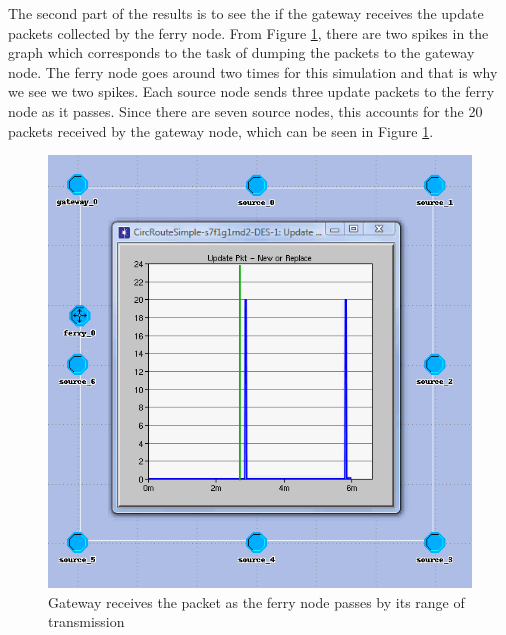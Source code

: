 The second part of the results is to see the if the gateway receives the update packets collected by the ferry node.  From Figure \ref{fig:result1-b}, there are two spikes in the graph which corresponds to the task of dumping the packets to the gateway node.  
The ferry node goes around two times for this simulation and that is why we see we two spikes.  
Each source node sends three update packets to the ferry node as it passes.  
Since there are seven source nodes, this accounts for the 20 packets received by the gateway node, which can be seen in Figure \ref{fig:result1-b}.


\begin{figure}[h]
    \centering
    \includegraphics[width=.5\textwidth]{images/scenario1-result-gateway}
    \caption{Gateway receives the packet as the ferry node passes by its range of transmission}
    \label{fig:result1-b}
\end{figure}

